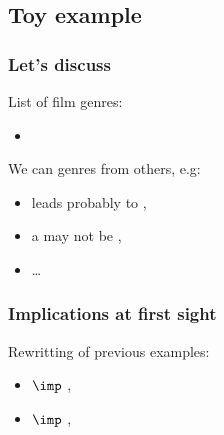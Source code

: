 
\subsection{Toy example}

\begin{frame}
\frametitle{Let's discuss}

List of film genres:
\begin{itemize}
	\item {}
\end{itemize}

\vspace{1.2em}

We can  genres from others, e.g:
\begin{itemize}
	\item {} leads probably to ,
	\item a  may not be ,
	\item \dots
\end{itemize}

\end{frame}

\begin{frame}
\frametitle{Implications at first sight}

Rewritting of previous examples:
\begin{itemize}
	\item {} $\imp$ ,
	\item {} $\imp$ ,
\end{itemize}

\end{frame}